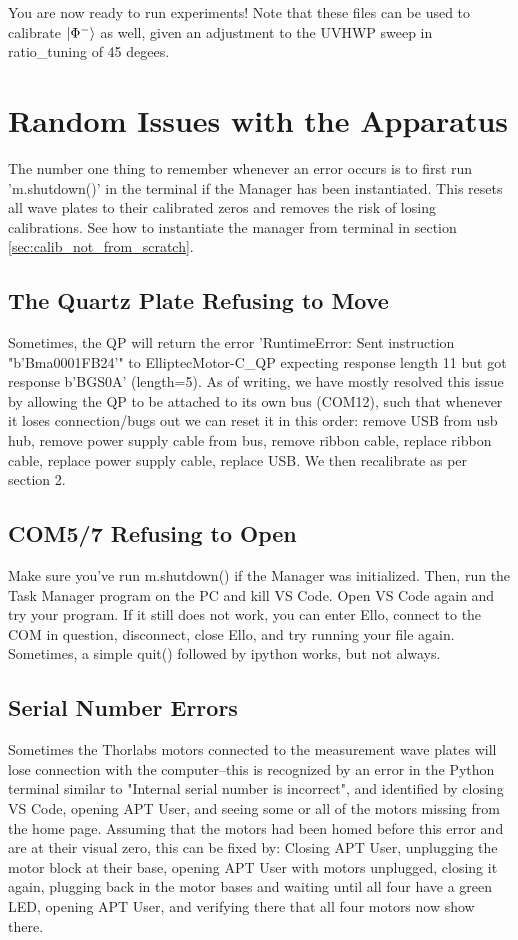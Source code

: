 \documentclass{paper}[11pt]
\begin{document}
You are now ready to run experiments! Note that these files can be used to calibrate $\ket{\Phi^-}$ as well, given an adjustment to the UVHWP sweep in ratio\_tuning of 45 degees. 

\section{Random Issues with the Apparatus}
The number one thing to remember whenever an error occurs is to first run 'm.shutdown()' in the terminal if the Manager has been instantiated. This resets all wave plates to their calibrated zeros and removes the risk of losing calibrations. See how to instantiate the manager from terminal in section \ref{sec:calib_not_from_scratch}.

\subsection{The Quartz Plate Refusing to Move}
Sometimes, the QP will return the error 'RuntimeError: Sent instruction "b'Bma0001FB24'" to ElliptecMotor-C\_QP expecting response length 11 but got response b'BGS0A' (length=5). As of writing, we have mostly resolved this issue by allowing the QP to be attached to its own bus (COM12), such that whenever it loses connection/bugs out we can reset it in this order: remove USB from usb hub, remove power supply cable from bus, remove ribbon cable, replace ribbon cable, replace power supply cable, replace USB. We then recalibrate as per section 2.
\subsection{COM5/7 Refusing to Open}
Make sure you've run m.shutdown() if the Manager was initialized. Then, run the Task Manager program on the PC and kill VS Code. Open VS Code again and try your program. If it still does not work, you can enter Ello, connect to the COM in question, disconnect, close Ello, and try running your file again. Sometimes, a simple quit() followed by ipython works, but not always.
\subsection{Serial Number Errors}
Sometimes the Thorlabs motors connected to the measurement wave plates will lose connection with the computer--this is recognized by an error in the Python terminal similar to "Internal serial number is incorrect", and identified by closing VS Code, opening APT User, and seeing some or all of the motors missing from the home page. Assuming that the motors had been homed before this error and are at their visual zero, this can be fixed by: Closing APT User, unplugging the motor block at their base, opening APT User with motors unplugged, closing it again, plugging back in the motor bases and waiting until all four have a green LED, opening APT User, and verifying there that all four motors now show there. 
\end{document}
